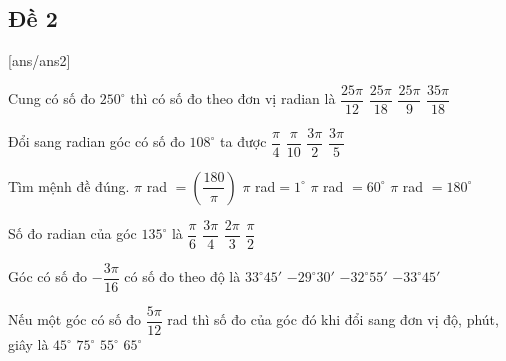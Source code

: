 \subsection{Đề 2}
[ans/ans2]
\caulc
\begin{ex}%
	Cung có số đo $250^\circ$ thì có số đo theo đơn vị radian là
	\choice
	{$\dfrac{25\pi}{12}$}
	{\True $\dfrac{25\pi}{18}$}
	{$\dfrac{25\pi}{9}$}
	{$\dfrac{35\pi}{18}$}
\end{ex}
\begin{ex}%
	Đổi sang radian góc có số đo $108^\circ$ ta được
	\choice
	{$\dfrac{\pi}{4}$}
	{$\dfrac{\pi}{10}$}
	{$\dfrac{3\pi}{2}$}
	{\True $\dfrac{3\pi}{5}$}
\end{ex}
\begin{ex}%
	Tìm mệnh đề đúng.
	\choice
	{$\pi$ rad $=\left(\dfrac{180}{\pi} \right)$}
	{$\pi$ rad$=1^\circ$}
	{$\pi$ rad $=60^\circ$}
	{\True $\pi$ rad $=180^\circ$}
	\loigiai{
	}
\end{ex}
\begin{ex}%
	Số đo radian của góc $135^\circ$ là
	\choice
	{$\dfrac{\pi}{6}$}
	{\True $\dfrac{3\pi}{4}$}
	{$\dfrac{2\pi}{3}$}
	{$\dfrac{\pi}{2}$}
\end{ex}

\begin{ex}%
	Góc có số đo $-\dfrac{3\pi}{16}$ có số đo theo độ là
	\choice
	{$33^{\circ} 45'$}
	{$-29^{\circ} 30'$}
	{$-32^{\circ} 55'$}
	{\True $-33^{\circ} 45'$}
\end{ex}
\begin{ex}%
	Nếu một góc có số đo $\dfrac{5\pi}{12}$ rad thì số đo của góc đó khi đổi sang đơn vị độ, phút, giây là
	\choice
	{$45^\circ$}
	{\True $75^\circ$}
	{$55^\circ$}
	{$65^\circ$}
\end{ex}



